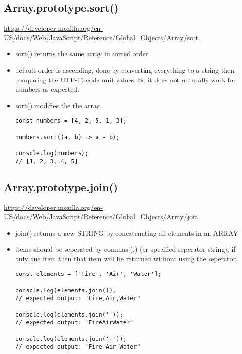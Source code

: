 \documentclass[10pt]{article}
\begin{document}
\pagebreak
\medskip %
\subsection{Array.prototype.sort()}
\url{https://developer.mozilla.org/en-US/docs/Web/JavaScript/Reference/Global_Objects/Array/sort}	

\begin{itemize}
	\item sort() returns the same array in sorted order
	\item default order is ascending, done by converting everything to a string then comparing the UTF-16 code unit values. So it does not naturally work for numbers as expected.
	\item sort() modifies the the array
	
\begin{lstlisting}[title=Example sort() for integers, captionpos=t]
const numbers = [4, 2, 5, 1, 3];

numbers.sort((a, b) => a - b);

console.log(numbers);
// [1, 2, 3, 4, 5]
\end{lstlisting}
\end{itemize}
\medskip %


\medskip %
\pagebreak
\subsection{Array.prototype.join()}
\url{https://developer.mozilla.org/en-US/docs/Web/JavaScript/Reference/Global_Objects/Array/join}

\begin{itemize}
	\item join() returns a new STRING by concatenating all elements in an ARRAY 
	\item items should be seperated by commas (,) (or specified seperator string), if only one item then that item will be returned without using the seperator.

	
\begin{lstlisting}[title=Example join(), captionpos=t]
const elements = ['Fire', 'Air', 'Water'];

console.log(elements.join());
// expected output: "Fire,Air,Water"

console.log(elements.join(''));
// expected output: "FireAirWater"

console.log(elements.join('-'));
// expected output: "Fire-Air-Water"
\end{lstlisting}
\end{itemize}
\medskip %
\end{document}
